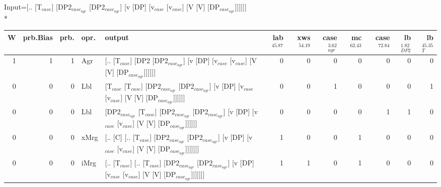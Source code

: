 \begingroup\scriptsize Input=[.. [T$_{case}$] [DP2$_{case_{agr}}$ [DP2$_{case_{agr}}$] [v [DP] [v$_{case}$ [v$_{case}$] [V [V] [DP$_{case_{agr}}$]]]]]]\\*
\begin{tabularx}{\linewidth}{rrrlXrrrrrrr}
\hline
   W &   prb.Bias &   prb. & opr.   & output                                                                                                                                                                           &   lab$^{45.87}$ &   xws$^{54.19}$ &   case$_{agr}^{3.62}$ &   mc$^{62.43}$ &   case$^{72.84}$ &   lb$_{DP2}^{1.82}$ &   lb$_{T}^{45.35}$ \\
\hline
   1 &       1 &   1 & Agr  & [.. [T$_{case}$] [DP2 [DP2$_{case_{agr}}$] [v [DP] [v$_{case}$ [v$_{case}$] [V [V] [DP$_{case_{agr}}$]]]]]]                                                                                              &             0 &             0 &                  0 &            0 &              0 &             0 &              0 \\
   0 &       0 &   0 & Lbl  & [T$_{case}$ [T$_{case}$] [DP2$_{case_{agr}}$ [DP2$_{case_{agr}}$] [v [DP] [v$_{case}$ [v$_{case}$] [V [V] [DP$_{case_{agr}}$]]]]]]                                                                                 &             0 &             0 &                  1 &            0 &              0 &             0 &              1 \\
   0 &       0 &   0 & Lbl  & [DP2$_{case_{agr}}$ [T$_{case}$] [DP2$_{case_{agr}}$ [DP2$_{case_{agr}}$] [v [DP] [v$_{case}$ [v$_{case}$] [V [V] [DP$_{case_{agr}}$]]]]]]                                                                           &             0 &             0 &                  0 &            0 &              1 &             1 &              0 \\
   0 &       0 &   0 & xMrg & [.. [C] [.. [T$_{case}$] [DP2$_{case_{agr}}$ [DP2$_{case_{agr}}$] [v [DP] [v$_{case}$ [v$_{case}$] [V [V] [DP$_{case_{agr}}$]]]]]]]                                                                            &             1 &             0 &                  0 &            1 &              0 &             0 &              0 \\
   0 &       0 &   0 & iMrg & [.. [T$_{case}$] [.. [T$_{case}$] [DP2$_{case_{agr}}$ [DP2$_{case_{agr}}$] [v [DP] [v$_{case}$ [v$_{case}$] [V [V] [DP$_{case_{agr}}$]]]]]]]                                                                       &             1 &             1 &                  0 &            1 &              0 &             0 &              0 \\

\end{tabularx}
